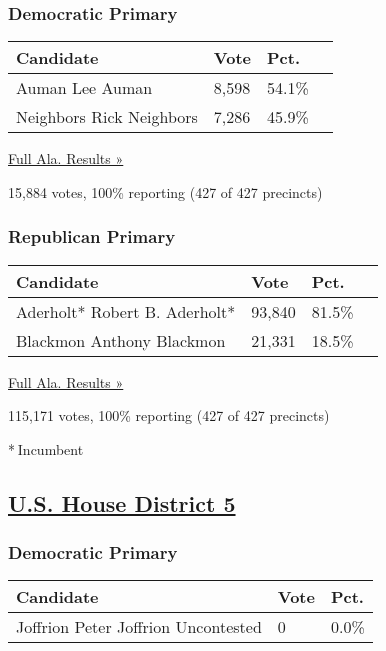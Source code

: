 \hypertarget{democratic-primary-4}{%
\subsubsection{Democratic Primary}\label{democratic-primary-4}}

\begin{longtable}[]{@{}llll@{}}
\toprule
Candidate & Vote & Pct. &\tabularnewline
\midrule
\endhead
 Auman Lee Auman & 8,598 & 54.1\% &\tabularnewline
 Neighbors Rick Neighbors & 7,286 & 45.9\% &\tabularnewline
\bottomrule
\end{longtable}

\href{https://www.nytimes3xbfgragh.onion/elections/results/alabama}{Full
Ala. Results »}

15,884 votes, 100\% reporting (427 of 427 precincts)

\hypertarget{republican-primary-4}{%
\subsubsection{Republican Primary}\label{republican-primary-4}}

\begin{longtable}[]{@{}llll@{}}
\toprule
Candidate & Vote & Pct. &\tabularnewline
\midrule
\endhead
 Aderholt* Robert B. Aderholt* & 93,840 & 81.5\% &\tabularnewline
 Blackmon Anthony Blackmon & 21,331 & 18.5\% &\tabularnewline
\bottomrule
\end{longtable}

\href{https://www.nytimes3xbfgragh.onion/elections/results/alabama}{Full
Ala. Results »}

115,171 votes, 100\% reporting (427 of 427 precincts)

* Incumbent

\hypertarget{us-house-district-5}{%
\subsection{\texorpdfstring{\href{https://www.nytimes3xbfgragh.onion/elections/results/alabama-house-district-5-primary-election}{U.S.
House District 5}}{U.S. House District 5}}\label{us-house-district-5}}

\hypertarget{democratic-primary-5}{%
\subsubsection{Democratic Primary}\label{democratic-primary-5}}

\begin{longtable}[]{@{}lll@{}}
\toprule
Candidate & Vote & Pct.\tabularnewline
\midrule
\endhead
 Joffrion Peter Joffrion Uncontested & 0 & 0.0\%\tabularnewline
\bottomrule
\end{longtable}

